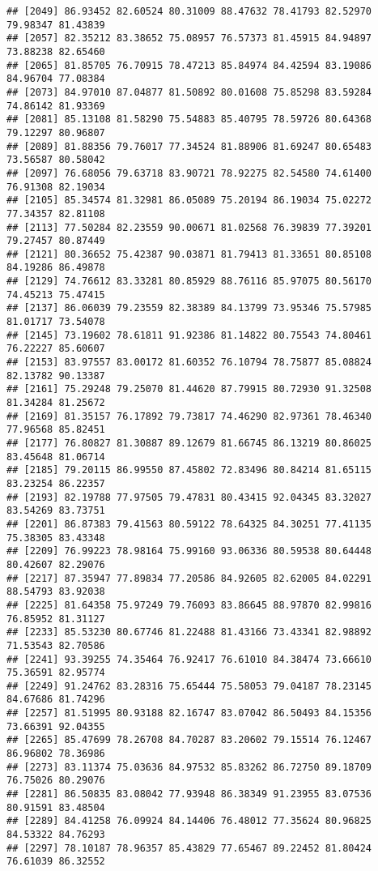 \documentclass[
]{article}
\begin{document}
\begin{verbatim}
## [2049] 86.93452 82.60524 80.31009 88.47632 78.41793 82.52970 79.98347 81.43839
## [2057] 82.35212 83.38652 75.08957 76.57373 81.45915 84.94897 73.88238 82.65460
## [2065] 81.85705 76.70915 78.47213 85.84974 84.42594 83.19086 84.96704 77.08384
## [2073] 84.97010 87.04877 81.50892 80.01608 75.85298 83.59284 74.86142 81.93369
## [2081] 85.13108 81.58290 75.54883 85.40795 78.59726 80.64368 79.12297 80.96807
## [2089] 81.88356 79.76017 77.34524 81.88906 81.69247 80.65483 73.56587 80.58042
## [2097] 76.68056 79.63718 83.90721 78.92275 82.54580 74.61400 76.91308 82.19034
## [2105] 85.34574 81.32981 86.05089 75.20194 86.19034 75.02272 77.34357 82.81108
## [2113] 77.50284 82.23559 90.00671 81.02568 76.39839 77.39201 79.27457 80.87449
## [2121] 80.36652 75.42387 90.03871 81.79413 81.33651 80.85108 84.19286 86.49878
## [2129] 74.76612 83.33281 80.85929 88.76116 85.97075 80.56170 74.45213 75.47415
## [2137] 86.06039 79.23559 82.38389 84.13799 73.95346 75.57985 81.01717 73.54078
## [2145] 73.19602 78.61811 91.92386 81.14822 80.75543 74.80461 76.22227 85.60607
## [2153] 83.97557 83.00172 81.60352 76.10794 78.75877 85.08824 82.13782 90.13387
## [2161] 75.29248 79.25070 81.44620 87.79915 80.72930 91.32508 81.34284 81.25672
## [2169] 81.35157 76.17892 79.73817 74.46290 82.97361 78.46340 77.96568 85.82451
## [2177] 76.80827 81.30887 89.12679 81.66745 86.13219 80.86025 83.45648 81.06714
## [2185] 79.20115 86.99550 87.45802 72.83496 80.84214 81.65115 83.23254 86.22357
## [2193] 82.19788 77.97505 79.47831 80.43415 92.04345 83.32027 83.54269 83.73751
## [2201] 86.87383 79.41563 80.59122 78.64325 84.30251 77.41135 75.38305 83.43348
## [2209] 76.99223 78.98164 75.99160 93.06336 80.59538 80.64448 80.42607 82.29076
## [2217] 87.35947 77.89834 77.20586 84.92605 82.62005 84.02291 88.54793 83.92038
## [2225] 81.64358 75.97249 79.76093 83.86645 88.97870 82.99816 76.85952 81.31127
## [2233] 85.53230 80.67746 81.22488 81.43166 73.43341 82.98892 71.53543 82.70586
## [2241] 93.39255 74.35464 76.92417 76.61010 84.38474 73.66610 75.36591 82.95774
## [2249] 91.24762 83.28316 75.65444 75.58053 79.04187 78.23145 84.67686 81.74296
## [2257] 81.51995 80.93188 82.16747 83.07042 86.50493 84.15356 73.66391 92.04355
## [2265] 85.47699 78.26708 84.70287 83.20602 79.15514 76.12467 86.96802 78.36986
## [2273] 83.11374 75.03636 84.97532 85.83262 86.72750 89.18709 76.75026 80.29076
## [2281] 86.50835 83.08042 77.93948 86.38349 91.23955 83.07536 80.91591 83.48504
## [2289] 84.41258 76.09924 84.14406 76.48012 77.35624 80.96825 84.53322 84.76293
## [2297] 78.10187 78.96357 85.43829 77.65467 89.22452 81.80424 76.61039 86.32552

\end{verbatim}
\end{document}

